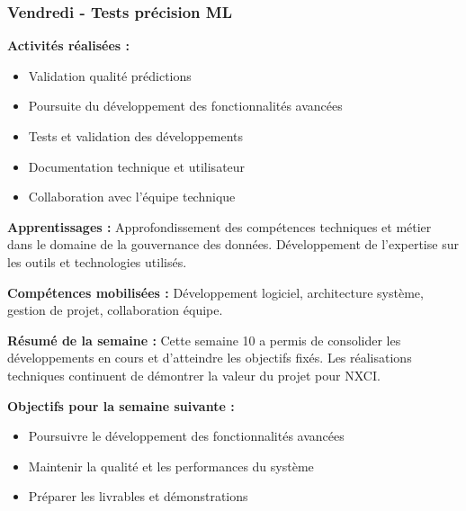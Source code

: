 \subsubsection{Vendredi - Tests précision ML}

\textbf{Activités réalisées :}
\begin{itemize}
    \item Validation qualité prédictions
    \item Poursuite du développement des fonctionnalités avancées
    \item Tests et validation des développements
    \item Documentation technique et utilisateur
    \item Collaboration avec l'équipe technique
\end{itemize}

\textbf{Apprentissages :}
Approfondissement des compétences techniques et métier dans le domaine de la gouvernance des données. Développement de l'expertise sur les outils et technologies utilisés.

\textbf{Compétences mobilisées :}
Développement logiciel, architecture système, gestion de projet, collaboration équipe.

\textbf{Résumé de la semaine :}
Cette semaine 10 a permis de consolider les développements en cours et d'atteindre les objectifs fixés. Les réalisations techniques continuent de démontrer la valeur du projet pour NXCI.

\textbf{Objectifs pour la semaine suivante :}
\begin{itemize}
    \item Poursuivre le développement des fonctionnalités avancées
    \item Maintenir la qualité et les performances du système
    \item Préparer les livrables et démonstrations
\end{itemize}

